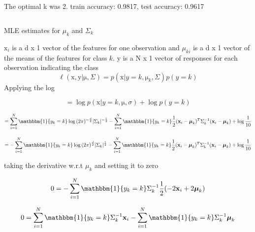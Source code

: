 \documentclass[12pt,letterpaper]{article} %
\newcommand{\bs}[1]{\bm{\mathrm{#1}}} %
\newcommand{\switch}[0]{\mathbbm{1}\{y_k=k\}}
\begin{document}
 \subsubsection{}
 
 The optimal k was 2. train accuracy: 0.9817, test accuracy: 0.9617
 
 \subsection{}
 
 MLE estimates for $\mu_k$ and $\Sigma_k$
 
 $\bs{x}_i$ is a d x 1 vector of the features for one observation and $\mu_{ki}$ is a d x 1 vector of the means of the features for class $k$. y is a N x 1 vector of responses for each observation indicating the class
 \begin{equation*}
  \ell(\bs{x},\bs{y}| \bs{\mu},\Sigma) = p(\bs{x}|y=k, \bs{\mu}_k,\Sigma)p(y=k)
 \end{equation*}
Applying the log

\begin{equation*}
 = \log{p(\bs{x}|y=k, \bs{\mu},\sigma)} + \log{p(y=k)}
 \end{equation*}

 \begin{equation*} 
  = \sum^N_{i=1}\switch{}\log{(2\pi)^{-\frac{d}{2}}|\Sigma_k|^{-\frac{1}{2}}}-\sum^N_{i=1}\switch{}\frac{1}{2}(\bs{x}_i-\bs{\mu}_{k})^T\Sigma_k^{-1}(\bs{x}_i -\bs{\mu}_{k}) + \log{\frac{1}{10}}
 \end{equation*}
 
  \begin{equation*} 
  = -\sum^N_{i=1}\switch{}\log{(2\pi)^{\frac{d}{2}}|\Sigma_k|^{\frac{1}{2}}}-\sum^N_{i=1}\switch{}\frac{1}{2}(\bs{x}_i-\bs{\mu}_{k})^T\Sigma_k^{-1}(\bs{x}_i -\bs{\mu}_{k}) + \log{\frac{1}{10}}
 \end{equation*}

taking the derivative w.r.t $\mu_{k}$ and setting it to zero

\begin{equation*} 
 0 = -\sum^N_{i=1}\switch\Sigma_k^{-1}\frac{1}{2}(-2\bs{x}_i + 2\bs{\mu}_{k})
\end{equation*}

\begin{equation*} 
 0 = \sum^N_{i=1}\switch\Sigma_k^{-1}\bs{x}_i - \sum^N_{i=1}\switch\Sigma_k^{-1} \bs{\mu}_{k}
\end{equation*}
\end{document}

